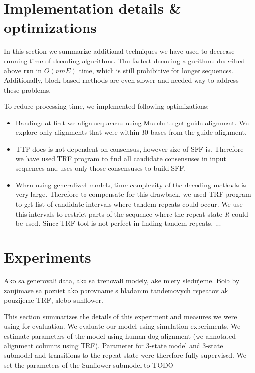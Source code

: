 \section{Implementation details \& optimizations}

In this section we summarize additional techniques we have used to decrease
running time of decoding algorithms. The fastest decoding algorithms described
above run in $O(nmE)$ time, which is still prohibitive for longer sequences.
Additionally, block-based methods are even slower and needed way to address
these problems.

To reduce processing time, we implemented following optimizations:
\begin{itemize}[itemsep=-1mm]
\item Banding: at first we align sequences using Muscle\cite{} to get guide
alignment. We explore only alignments that were within 30 bases from the guide
alignment.

\item TTP does is not dependent on consensus, however size of SFF is. Therefore
we have used TRF program to find all candidate consensuses in input sequences
and uses only those consensuses to build SFF.

\item When using generalized models, time complexity of the decoding methods is
very large.  Therefore to compensate for this drawback, we used TRF program to
get list of candidate intervals where tandem repeats could occur. We use this
intervals to restrict parts of the sequence where the repeat state $R$ could be
used. Since TRF tool is not perfect in finding tandem repeats, ...

\end{itemize}

\section{Experiments}
\begin{reformulate*}
Ako sa generovali data, ako sa trenovali modely, ake miery sledujeme.  Bolo by
zaujimave sa pozriet ako porovname s hladanim tandemovych repeatov ak pouzijeme
TRF, alebo sunflower.

\end{reformulate*}


This section summarizes the details of this experiment and measures we were
using for evaluation. We evaluate our model using simulation experiments.  We
estimate parameters of the model using human-dog alignment (we annotated
alignment columns using TRF). Parameter for 3-state model and 3-state submodel
and transitions to the repeat state were therefore fully supervised.
We set the parameters of the Sunflower submodel to TODO


